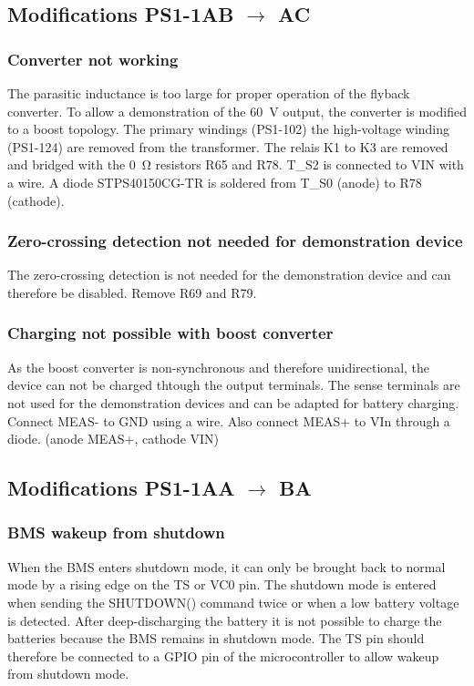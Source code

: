 \subsection{Modifications PS1-1AB $\to$ AC}

\subsubsection{Converter not working}
The parasitic inductance is too large for proper operation of the flyback converter. To allow a demonstration of the \qty{60}{\volt} output, the converter is modified to a boost topology. The primary windings (PS1-102) the high-voltage winding (PS1-124) are removed from the transformer. The relais K1 to K3 are removed and bridged with the \qty{0}{\ohm} resistors R65 and R78. T\_S2 is connected to VIN with a wire. A diode STPS40150CG-TR is soldered from T\_S0 (anode) to R78 (cathode). 

\subsubsection{Zero-crossing detection not needed for demonstration device}
The zero-crossing detection is not needed for the demonstration device and can therefore be disabled. Remove R69 and R79. 

\subsubsection{Charging not possible with boost converter}
As the boost converter is non-synchronous and therefore unidirectional, the device can not be charged thtough the output terminals. The sense terminals are not used for the demonstration devices and can be adapted for battery charging. Connect MEAS- to GND using a wire. Also connect MEAS+ to VIn through a diode. (anode MEAS+, cathode VIN)

\subsection{Modifications PS1-1AA $\to$ BA}

\subsubsection{BMS wakeup from shutdown}
When the BMS enters shutdown mode, it can only be brought back to normal mode by a rising edge on the TS or VC0 pin. The shutdown mode is entered when sending the SHUTDOWN() command twice or when a low battery voltage is detected. After deep-discharging the battery it is not possible to charge the batteries because the BMS remains in shutdown mode. The TS pin should therefore be connected to a GPIO pin of the microcontroller to allow wakeup from shutdown mode. 

